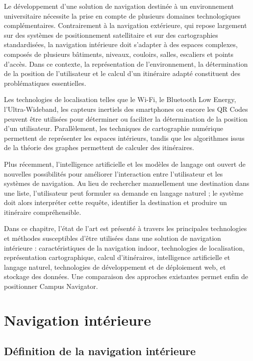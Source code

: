 \documentclass[12pt,a4paper]{report}
\begin{document}
Le développement d'une solution de navigation destinée à un environnement universitaire nécessite
la prise en compte de plusieurs domaines technologiques complémentaires. Contrairement à la
navigation extérieure, qui repose largement sur des systèmes de positionnement satellitaire et
sur des cartographies standardisées, la navigation intérieure doit s'adapter à des espaces
complexes, composés de plusieurs bâtiments, niveaux, couloirs, salles, escaliers et points
d'accès. Dans ce contexte, la représentation de l'environnement, la détermination de la position
de l'utilisateur et le calcul d'un itinéraire adapté constituent des problématiques essentielles.

Les technologies de localisation telles que le Wi-Fi, le Bluetooth Low Energy, l'Ultra-Wideband,
les capteurs inertiels des smartphones ou encore les QR Codes peuvent être utilisées pour
déterminer ou faciliter la détermination de la position d'un utilisateur. Parallèlement, les
techniques de cartographie numérique permettent de représenter les espaces intérieurs, tandis que
les algorithmes issus de la théorie des graphes permettent de calculer des itinéraires.

Plus récemment, l'intelligence artificielle et les modèles de langage ont ouvert de nouvelles
possibilités pour améliorer l'interaction entre l'utilisateur et les systèmes de navigation. Au
lieu de rechercher manuellement une destination dans une liste, l'utilisateur peut formuler sa
demande en langage naturel ; le système doit alors interpréter cette requête, identifier la
destination et produire un itinéraire compréhensible.

Dans ce chapitre, l'état de l'art est présenté à travers les principales technologies et méthodes
susceptibles d'être utilisées dans une solution de navigation intérieure : caractéristiques de la
navigation indoor, technologies de localisation, représentation cartographique, calcul
d'itinéraires, intelligence artificielle et langage naturel, technologies de développement et de
déploiement web, et stockage des données. Une comparaison des approches existantes permet enfin
de positionner Campus Navigator.

\section{Navigation intérieure}

\subsection{Définition de la navigation intérieure}
\end{document}
